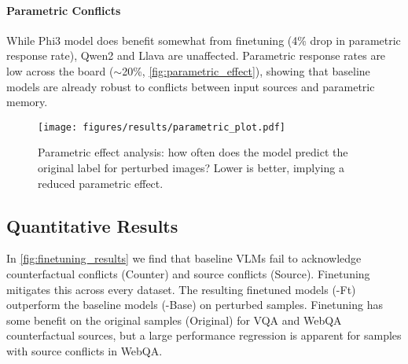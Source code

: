 \paragraph{Parametric Conflicts}
While Phi3 model does benefit somewhat from finetuning (4\% drop in parametric response rate), Qwen2 and Llava are unaffected. Parametric response rates are low across the board ($\sim$20\%, \autoref{fig:parametric_effect}), showing that baseline models are already robust to conflicts between input sources and parametric memory.

\begin{figure}
    \centering
   
    \texttt{[image: figures/results/parametric\_plot.pdf]}
    \vspace{-4mm}
    \caption{Parametric effect analysis: how often does the model predict the original label for perturbed images? Lower is better, implying a reduced parametric effect.}
    \label{fig:parametric_effect}
    \vspace{-2mm}
\end{figure}


\subsection{Quantitative Results}
In \autoref{fig:finetuning_results} we find that baseline VLMs fail to acknowledge counterfactual conflicts (Counter) and source conflicts (Source). Finetuning mitigates this across every dataset. The resulting finetuned models (-Ft) outperform the baseline models (-Base) on perturbed samples. Finetuning has some benefit on the original samples (Original) for VQA and WebQA counterfactual sources, but a large performance regression is apparent for samples with source conflicts in WebQA.




